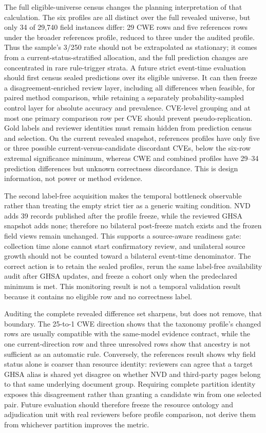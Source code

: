 The full eligible-universe census changes the planning interpretation of that calculation. The six profiles are all distinct over the full revealed universe, but only 34 of 29,740 field instances differ: 29 CWE rows and five references rows under the broader references profile, reduced to three under the audited profile. Thus the sample's 3/250 rate should not be extrapolated as stationary; it comes from a current-status-stratified allocation, and the full prediction changes are concentrated in rare rule-trigger strata. A future strict event-time evaluation should first census sealed predictions over its eligible universe. It can then freeze a disagreement-enriched review layer, including all differences when feasible, for paired method comparison, while retaining a separately probability-sampled control layer for absolute accuracy and prevalence. CVE-level grouping and at most one primary comparison row per CVE should prevent pseudo-replication. Gold labels and reviewer identities must remain hidden from prediction census and selection. On the current revealed snapshot, references profiles have only five or three possible current-versus-candidate discordant CVEs, below the six-row extremal significance minimum, whereas CWE and combined profiles have 29--34 prediction differences but unknown correctness discordance. This is design information, not power or method evidence.

The second label-free acquisition makes the temporal bottleneck observable rather than treating the empty strict tier as a generic waiting condition. NVD adds 39 records published after the profile freeze, while the reviewed GHSA snapshot adds none; therefore no bilateral post-freeze match exists and the frozen field views remain unchanged. This supports a source-aware readiness gate: collection time alone cannot start confirmatory review, and unilateral source growth should not be counted toward a bilateral event-time denominator. The correct action is to retain the sealed profiles, rerun the same label-free availability audit after GHSA updates, and freeze a cohort only when the predeclared minimum is met. This monitoring result is not a temporal validation result because it contains no eligible row and no correctness label.

Auditing the complete revealed difference set sharpens, but does not remove, that boundary. The 25-to-1 CWE direction shows that the taxonomy profile's changed rows are usually compatible with the same-model evidence contract, while the one current-direction row and three unresolved rows show that ancestry is not sufficient as an automatic rule. Conversely, the references result shows why field status alone is coarser than resource identity: reviewers can agree that a target GHSA alias is shared yet disagree on whether NVD and third-party pages belong to that same underlying document group. Requiring complete partition identity exposes this disagreement rather than granting a candidate win from one selected pair. Future evaluation should therefore freeze the resource ontology and adjudication unit with real reviewers before profile comparison, not derive them from whichever partition improves the metric.

